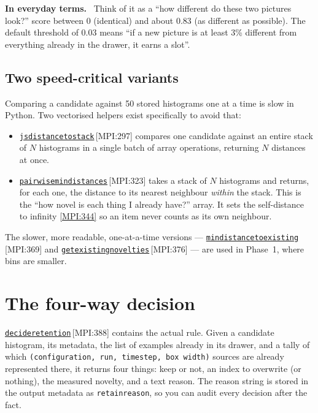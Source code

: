 \documentclass[11pt,a4paper]{report}
\newcommand{\srcbase}{vscode://file/Users/syellapa/Documents/Research/2026/ANSYS/Multi-ScalarPDF}
\newcommand{\srctag}[1]{{\footnotesize\textcolor{TagGray}{[#1]}}}
\newcommand{\Mpi}[2]{\href{\srcbase/EnsightPDFHybridDatasetMPI.py:#1}{\texttt{#2}}\,\srctag{MPI:#1}}
\newcommand{\MpiL}[1]{\href{\srcbase/EnsightPDFHybridDatasetMPI.py:#1}{\srctag{MPI:#1}}}
\newcommand{\code}[1]{\texttt{#1}}
\renewcommand{\_}{\origtextunderscore\allowbreak}
\newlength{\calloutwidth}
\newcommand{\calloutOpen}{%
  \par\medskip\noindent
  \setlength{\calloutwidth}{\dimexpr\linewidth-2\fboxsep\relax}%
  \begin{lrbox}{\calloutbox}\begin{minipage}{\calloutwidth}}
\newcommand{\calloutClose}[1]{%
  \end{minipage}\end{lrbox}\colorbox{#1}{\usebox{\calloutbox}}\par\medskip}
\newenvironment{analogy}
  {\calloutOpen\textbf{In everyday terms.}\ }
  {\calloutClose{BoxBG}}
\begin{document}
\begin{analogy}
Think of it as a ``how different do these two pictures look?'' score between 0 (identical)
and about 0.83 (as different as possible). The default threshold of 0.03 means ``if a new
picture is at least 3\% different from everything already in the drawer, it earns a slot''.
\end{analogy}

\subsection*{Two speed-critical variants}

Comparing a candidate against 50 stored histograms one at a time is slow in Python. Two
vectorised helpers exist specifically to avoid that:

\begin{itemize}
  \item \Mpi{297}{js\_distance\_to\_stack} compares one candidate against an entire stack of
        $N$ histograms in a single batch of array operations, returning $N$ distances at once.
  \item \Mpi{323}{pairwise\_min\_distances} takes a stack of $N$ histograms and returns, for
        each one, the distance to its nearest neighbour \emph{within} the stack. This is the
        ``how novel is each thing I already have?'' array. It sets the self-distance to
        infinity \MpiL{344} so an item never counts as its own neighbour.
\end{itemize}

The slower, more readable, one-at-a-time versions --- \Mpi{369}{min\_distance\_to\_existing}
and \Mpi{376}{get\_existing\_novelties} --- are used in Phase~1, where bins are smaller.

\section{The four-way decision}

\Mpi{388}{decide\_retention} contains the actual rule. Given a candidate histogram, its
metadata, the list of examples already in its drawer, and a tally of which
\code{(configuration, run, timestep, box width)} sources are already represented there, it
returns four things: keep or not, an index to overwrite (or nothing), the measured novelty,
and a text reason. The reason string is stored in the output metadata as
\code{retain\_reason}, so you can audit every decision after the fact.
\end{document}
